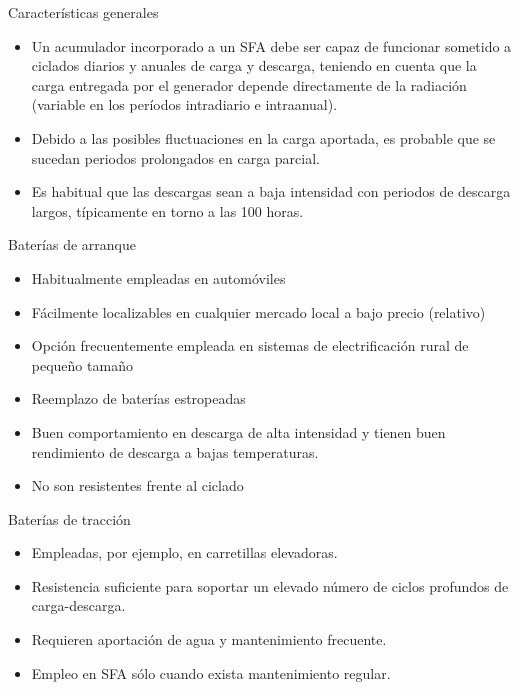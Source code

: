 \documentclass[xcolor={usenames,svgnames,dvipsnames}]{beamer}
\begin{document}
\begin{frame}[label=sec-2-6-1]{Características generales}
\begin{itemize}
\item Un acumulador incorporado a un SFA debe ser \alert{capaz de funcionar sometido a ciclados diarios y anuales de carga y descarga}, teniendo en cuenta que la carga entregada por el generador depende directamente de la radiación (variable en los períodos intradiario e intraanual).

\item Debido a las posibles fluctuaciones en la carga aportada, es probable que se sucedan \alert{periodos prolongados en carga parcial}.

\item Es habitual que las \alert{descargas sean a baja intensidad con periodos de descarga largos}, típicamente en torno a las 100 horas.
\end{itemize}
\end{frame}

\begin{frame}[label=sec-2-6-2]{Baterías de arranque}
\begin{itemize}
\item Habitualmente empleadas en automóviles

\item Fácilmente localizables en cualquier mercado local a bajo precio (relativo)

\item Opción frecuentemente empleada en sistemas de electrificación rural de pequeño tamaño

\item Reemplazo de baterías estropeadas

\item Buen comportamiento en descarga de alta intensidad y tienen buen rendimiento de descarga a bajas temperaturas.

\item No son resistentes frente al ciclado
\end{itemize}
\end{frame}

\begin{frame}[label=sec-2-6-3]{Baterías de tracción}
\begin{itemize}
\item Empleadas, por ejemplo, en carretillas elevadoras.

\item Resistencia suficiente para soportar un elevado número de ciclos profundos de carga-descarga.

\item Requieren aportación de agua y mantenimiento frecuente.

\item Empleo en SFA sólo cuando exista mantenimiento regular.
\end{itemize}
\end{frame}
\end{document}

